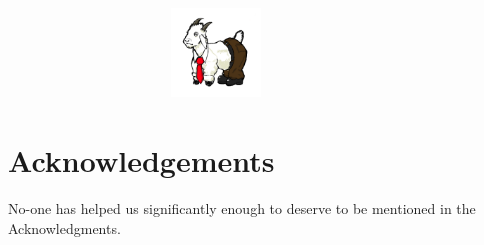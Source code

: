 \begin{figure}
\centering
\includegraphics[width=3.5in,height=0.93in]{ECEWordMark-Tower_black.png}
\end{figure}

\maketitle

\newpage



\section*{Acknowledgements}

No-one has helped us significantly enough to deserve to be mentioned in the Acknowledgments.






